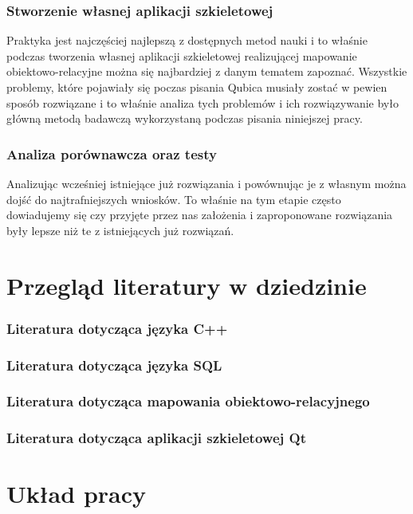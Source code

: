\documentclass[12pt]{report}
\begin{document}
\subsubsection{Stworzenie własnej aplikacji szkieletowej}

Praktyka jest najczęściej najlepszą z dostępnych metod nauki i to właśnie podczas tworzenia własnej aplikacji szkieletowej realizującej mapowanie obiektowo-relacyjne można
się najbardziej z danym tematem zapoznać. Wszystkie problemy, które pojawiały się poczas pisania Qubica musiały zostać w pewien sposób roz\-wią\-zane i to właśnie analiza
tych problemów i ich rozwiązywanie było główną metodą badawczą wykorzystaną podczas pisania niniejszej pracy.

\subsubsection{Analiza porównawcza oraz testy}

Analizując wcześniej istniejące już rozwiązania i powównując je z własnym można dojść do najtrafniejszych wniosków. To właśnie na tym etapie często dowiadujemy się czy
przyjęte przez nas założenia i zaproponowane rozwiązania były lepsze niż te z istniejących już rozwiązań. 

\section{Przegląd literatury w dziedzinie}

\subsubsection{Literatura dotycząca języka C++}

\subsubsection{Literatura dotycząca języka SQL}

\subsubsection{Literatura dotycząca mapowania obiektowo-relacyjnego}

\subsubsection{Literatura dotycząca aplikacji szkieletowej Qt}

\section{Układ pracy} %
\end{document}
